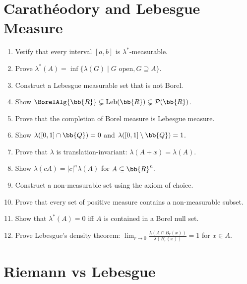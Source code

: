 \section{Carathéodory and Lebesgue Measure}

\begin{enumerate}
    \item Verify that every interval $[a, b]$ is $\lambda^*$-measurable.
    \item Prove $\lambda^*(A) = \inf\{\lambda(G) \mid G \text{ open}, G \supseteq A\}$.
    \item Construct a Lebesgue measurable set that is not Borel.
    \item Show $\BorelAlg{\bb{R}} \subsetneq \text{Leb}(\bb{R}) \subsetneq \mathcal{P}(\bb{R})$.
    \item Prove that the completion of Borel measure is Lebesgue measure.
    \item Show $\lambda([0,1] \cap \bb{Q}) = 0$ and $\lambda([0,1] \setminus \bb{Q}) = 1$.
    \item Prove that $\lambda$ is translation-invariant: $\lambda(A + x) = \lambda(A)$.
    \item Show $\lambda(cA) = |c|^n \lambda(A)$ for $A \subseteq \bb{R}^n$.
    \item Construct a non-measurable set using the axiom of choice.
    \item Prove that every set of positive measure contains a non-measurable subset.
    \item Show that $\lambda^*(A) = 0$ iff $A$ is contained in a Borel null set.
    \item Prove Lebesgue's density theorem: $\lim_{r \to 0} \frac{\lambda(A \cap B_r(x))}{\lambda(B_r(x))} = 1$ for \almosteverywhere{} $x \in A$.
\end{enumerate}

\section{Riemann vs Lebesgue}

